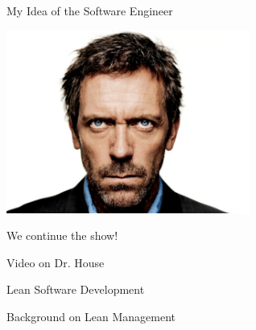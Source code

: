 \documentclass{beamer}
\begin{document}
\begin{frame}{\centerline{My Idea of the Software Engineer}}

\begin{center}
\includegraphics[width=80mm]{A2022.IDSEPC.ProcessoDiProduzione/DrHouse_SoftwareEngineer.jpg}
\end{center}

\end{frame}

\begin{frame}{\centerline{We continue the show!}}
\vspace*{1.5cm}
\begin{center}
\Huge Video on Dr. House

\end{center}

\end{frame}




\begin{frame}{\centerline{Lean Software Development}}
\begin{center}
\LARGE
Background on Lean Management
\end{center}
\end{frame}
\end{document}
